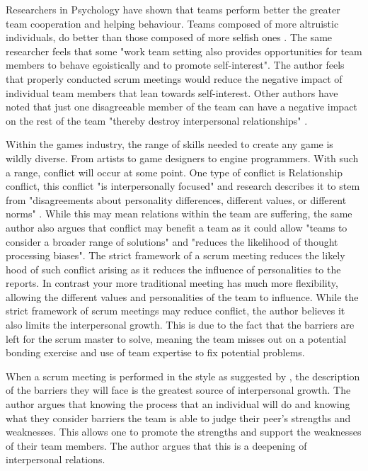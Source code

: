 \documentclass{scrartcl}
\begin{document}
Researchers in Psychology have shown that teams perform better the greater team cooperation and helping behaviour. Teams composed of more altruistic individuals, do better than those composed of more selfish ones \cite[p. 542]{li2014toward}.  The same researcher feels that some "work team setting also provides opportunities for team members to behave egoistically and to promote self-interest"\cite[p. 542]{li2014toward}. The author feels that properly conducted scrum meetings would reduce the negative impact of individual team members that lean towards self-interest. Other authors have noted that just one disagreeable member of the team can have a negative impact on the rest of the team "thereby destroy interpersonal relationships" \cite[p. 381] {barrick1998relating}.

Within the games industry, the range of skills needed to create any game is wildly diverse. From artists to game designers to engine programmers. With such a range, conflict will occur at some point\cite{gorse2007communication}. One type of conflict is Relationship conflict, this conflict "is interpersonally focused" \cite [p. 215]{costa2015direct} and research describes it to stem from "disagreements about personality differences, different values, or different norms" \cite [p. 215]{costa2015direct}. While this may mean relations within the team are suffering, the same author also argues that conflict may benefit a team as it could allow "teams to consider a broader range of solutions" and "reduces the likelihood of thought processing biases"\cite [p. 215]{costa2015direct}. The strict framework of a scrum meeting reduces the likely hood of such conflict arising as it reduces the influence of personalities to the reports. In contrast your more traditional meeting has much more flexibility, allowing the different values and personalities of the team to influence. While the strict framework of scrum meetings may reduce conflict, the author believes it also limits the interpersonal growth. This is due to the fact that the barriers are left for the scrum master to solve, meaning the team misses out on a potential bonding exercise and use of team expertise to fix potential problems.

When a scrum meeting is performed in the style as suggested by \cite{ DailyScrum, EffectiveScrum}, the description of the barriers they will face is the greatest source of interpersonal growth. The author argues that knowing the process that an individual will do and knowing what they consider barriers the team is able to judge their peer’s strengths and weaknesses. This allows one to promote the strengths and support the weaknesses of their team members. The author argues that this is a deepening of interpersonal relations.
\end{document}
